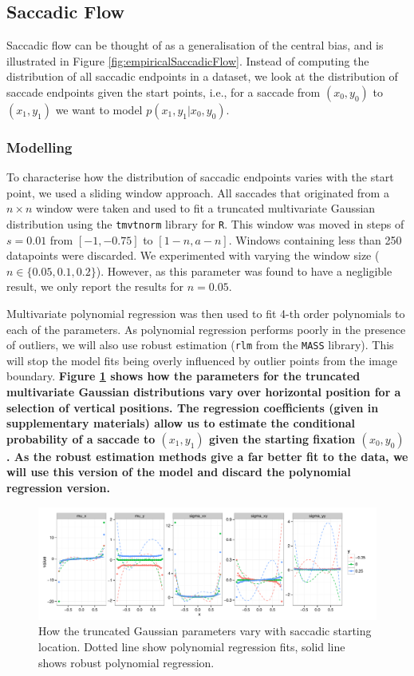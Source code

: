 \documentclass[a4paper, twocolumn, oneside, 11pt]{article}
\begin{document}
\subsection{Saccadic Flow}
\label{ModellingFlow}

Saccadic flow can be thought of as a generalisation of the central bias, and is illustrated in Figure \ref{fig:empiricalSaccadicFlow}. Instead of computing the distribution of all saccadic endpoints in a dataset, we look at the distribution of saccade endpoints given the start points, i.e., for a saccade from $(x_0, y_0)$ to $(x_1, y_1)$ we want to model $p(x_1,y_1|x_0, y_0)$.

\subsubsection{Modelling}

To characterise how the distribution of saccadic endpoints varies with the start point, we used a sliding window approach. All saccades that originated from a $n\times n$ window were taken and used to fit a truncated multivariate Gaussian distribution using the \texttt{tmvtnorm} library for \texttt{R}. This window was moved in steps of $s=0.01$ from $[-1,-0.75]$ to $[1-n, a-n]$. Windows containing less than 250 datapoints were discarded. We experimented with varying the window size ($n\in\{0.05,0.1, 0.2\}$). However, as this parameter was found to have a negligible result, we only report the results for $n=0.05$.

Multivariate polynomial regression was then used to fit 4-th order polynomials to each of the parameters. As polynomial regression performs poorly in the presence of outliers, we will also use robust estimation (\texttt{rlm} from the \texttt{MASS} library). This will stop the model fits being overly influenced by outlier points from the image boundary. \textbf{Figure \ref{fig:nParamsOverSpace} shows how the parameters for the truncated multivariate Gaussian distributions vary over horizontal position for a selection of vertical positions. The regression coefficients (given in supplementary materials) allow us to estimate the conditional probability of a saccade to $(x_1, y_1)$ given the starting fixation $(x_0, y_0)$. As the robust estimation methods give a far better fit to the data, we will use this version of the model and discard the polynomial regression version.}

\begin{figure}[ht]
\centering
\includegraphics[width=13cm]{../scripts/flow/figs/NparamsChagingOverSpace_ALL_tN}
\caption{How the truncated Gaussian parameters vary with saccadic starting location. Dotted line show polynomial regression fits, solid line shows robust polynomial regression.}
\label{fig:nParamsOverSpace}
\end{figure}
\end{document}
